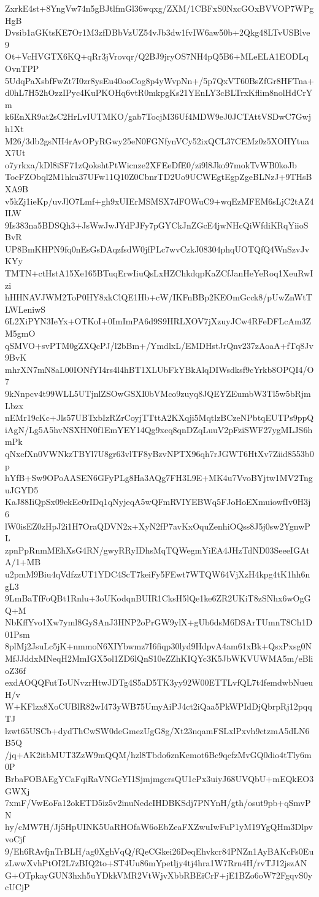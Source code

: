 ZxrkE4st+8YngVw74n5gBJtlfmGl36wqxg/ZXM/1CBFxS0NxcGOxBVVOP7WPgHgB
Dvsib1aGKtsKE7Or1M3zfDBbVzUZ54vJb3dw1fvIW6aw50b+2Qkg48LTvUSBlve9
Ot+VcHVGTX6KQ+qRr3jVrovqr/Q2BJ9jryOS7NH4pQ5B6+MLeELA1EODLqOvnTPP
5UdqPaXsbfFwZt7I0zr8ysEu40ooCog8p4yWvpNn+/5p7QxVT60BsZfGr8HFTna+
d0hL7H52hOzzIPyc4KuPKOHq6vtR0mkpgKs21YEnLY3cBLTrxKflim8nolHdCrYm
k6EnXR9at2sC2HrLvIUTMKO/gab7TocjM36Uf4MDW9eJ0JCTAttVSDwC7Gwjh1Xt
M26/3db2gsNH4rAvOPyRGwy25eN0FGNfynVCy52ixQCL37CEMz0z5XOHYtuaX7Ut
o7yrkxa/kDl8iSF71zQokshtPtWicnze2XFEeDfE0/zi9l8Jko97mokTvWB0koJb
TocFZObql2M1hku37UFw11Q10Z0CbnrTD2Uo9UCWEgtEgpZgeBLNzJ+9THsBXA9B
v5kZj1ieKp/uvJlO7Lmf+gh9xUIErMSMSX7dFOWuC9+wqEzMFEM6sLjC2tAZ4ILW
9Is383na5BDSQh3+JsWwJwJYdPJFy7pGYCkJnZGcE4jwNHcQiWfdiKRqYiioSBvR
UP8BmKHPN9fq0nEsGsDAqzfsdW0jfPLc7wvCzkJ08304phqUOTQfQ4WnSzvJvKYy
TMTN+ctHstA15Xe165BTuqErwIiuQsLxHZChkdqpKaZCfJanHeYeRoq1XeuRwIzi
hHHNAVJWM2ToP0HY8xkClQE1Hb+cW/IKFnBBp2KEOmGcck8/pUwZnWtTLWLeniwS
6L2XiPYN3IeYx+OTKoI+0ImImPA6d9S9HRLXOV7jXzuyJCw4RFeDFLcAm3ZM5gmO
qSMVO+svPTM0gZXQcPJ/l2bBm+/YmdlxL/EMDHstJrQnv237zAoaA+fTq8Jv9BvK
mhrXN7mN8aL00IONfYI4rs4l4hBT1XLUbFkYBkAlqDIWsdksf9cYrkb8OPQI4/O7
9kNnpcv4t99WLL5UTjnlZSOwGSXI0bVMco9zuyq8JQEYZEumbW3Tl5w5bRjmLbzx
nEMr19cKc+Jls57UBTxbIzRZrCoyjTTttA2KXqji5MqtlzBCzeNPbtqEUTPs9ppQ
iAgN/Lg5A5hvNSXHN0f1EmYEY14Qg9xeq8qnDZqLuuV2pFziSWF27ygMLJS6hmPk
qNxefXn0VWNkzTBYl7U8gr63vlTF8yBzvNPTX96qh7rJGWT6HtXv7Ziid8553b0p
hYfB+Sw9OPoAASEN6GFyPLg8Ha3AQg7FH3L9E+MK4u7VvoBYjtw1MV2TnguJGYD5
KaJ88IiQpSx09ekEe0rIDq1qNyjeqA5wQFmRVIYEBWq5FJoHoEXmuiowfIv0H3j6
lW0isEZ0zHpJ2i1H7OraQDVN2x+XyN2fP7avKxOquZenhiOQss8J5j0sw2YgnwPL
zpnPpRnmMEhXsG4RN/gwyRRyIDhsMqTQWegmYiEA4JHzTdND03SeeeIGAtA/1+MB
u2pmM9Biu4qVdfzzUT1YDC4ScT7keiFy5FEwt7WTQW64VjXzH4kpg4tK1hh6ngL3
9LmBaTfFoQBt1Rnlu+3oUKodqnBUIR1CksH5lQe1ke6ZR2UKiT8zSNhx6wOgGQ+M
NbKffYvo1Xw7yml8GySAnJ3HNP2oPrGW9ylX+gUb6dsM6DSArTUmnT8Ch1D01Psm
8plMj2JsuLc5jK+nmmoN6XIYbwmz7I6fiqp30lyd9HdpvA4am61xBk+QsxPxsg0N
MfJJddxMNeqH2MmIGX5ol1ZD6lQnS10eZZhKIQYc3K5JbWKVUWMA5m/eBlioZ36f
exdAOQQFutToUNvzrHtwJDTg4S5aD5TK3yy92W00ETTLvfQL7t4femdwbNueuH/v
W+KFlzx8XoCUBlR82wI473yWB75UmyAiPJ4ct2iQaa5PkWPIdDjQbrpRj12pqqTJ
lzwt65USCb+dydThCwSW0deGmezUgG8g/Xt23nqamFSLxlPxvh9ctzmA5dLN6B5Q
/jq+AK2itbMUT3ZzW9mQQM/hzl8Tbdo6znKemot6Bc9qcfzMvGQ0dio4tTly6m0P
BrbaFOBAEgYCaFqiRaVNGcYI1SjmjmgcrsQU1cPx3uiyJ68UVQbU+mEQkEO3GWXj
7xmF/VwEoFa12okETD5iz5v2inuNedcIHDBKSdj7PNYnH/gth/osut9pb+qSmvPN
hy/cMW7H/Jj5HpUINK5UaRHOfaW6oEbZeaFXZwuIwFuP1yM19YgQHm3DlpvvoCjf
9/Eh6RAvfjnTrBLH/ag0XghVqQ/fQeCGkei26DeqEhvkcr84PNZn1AyBAKcFs0Eu
zLwwXvhPtOI2L7zBIQ2to+ST4Uu86mYpetljy4tj4hra1W7Rrn4H/rvTJ12jszAN
G+OTpkayGUN3hxh5uYDkkVMR2VtWjvXbbRBEiCrF+jE1BZo6oW72FgqvS0ycUCjP
